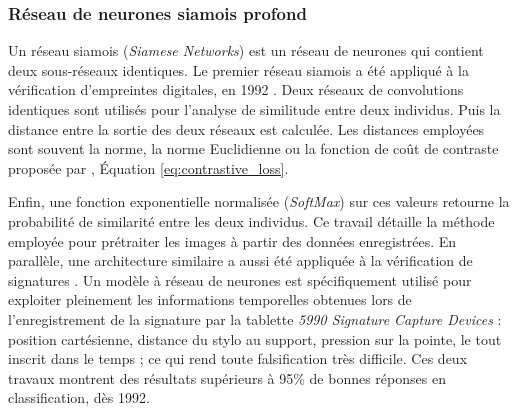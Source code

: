 
\subsubsection{Réseau de neurones siamois profond} \label{subsubsec:siamese}
Un réseau siamois (\textit{Siamese Networks}) est un réseau de neurones qui contient deux sous-réseaux identiques.
Le premier réseau siamois a été appliqué à la vérification d'empreintes digitales, en 1992 \cite{baldi_neural_1993}.
Deux réseaux de convolutions identiques sont utilisés pour l'analyse de similitude entre deux individus.
Puis la distance entre la sortie des deux réseaux est calculée.
Les distances employées sont souvent la norme, la norme Euclidienne ou la fonction de coût de contraste proposée par \citeauthor{hadsell_dimensionality_2006} \cite{hadsell_dimensionality_2006}, Équation \ref{eq:contrastive_loss}.

Enfin, une fonction exponentielle normalisée (\textit{SoftMax}) sur ces valeurs retourne la probabilité de similarité entre les deux individus.
Ce travail détaille la méthode employée pour prétraiter les images à partir des données enregistrées.
En parallèle, une architecture similaire a aussi été appliquée à la vérification de signatures \cite{bromley_signature_1993}.
Un modèle à réseau de neurones est spécifiquement utilisé pour exploiter pleinement les informations temporelles obtenues lors de l'enregistrement de la signature par la tablette \textit{5990 Signature Capture Devices} : position cartésienne, distance du stylo au support, pression sur la pointe, le tout inscrit dans le temps ; ce qui rend toute falsification très difficile.
Ces deux travaux montrent des résultats supérieurs à 95\% de bonnes réponses en classification, dès 1992.

